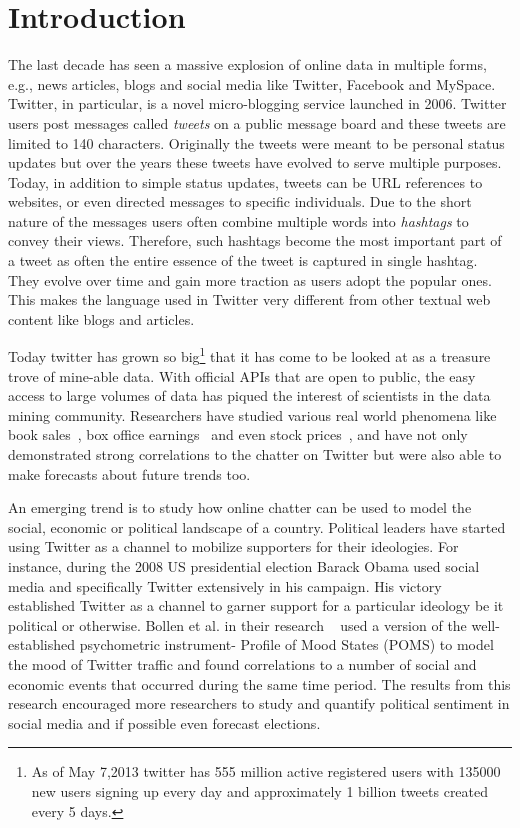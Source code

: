 \chapter{Introduction}
The last decade has seen a massive explosion of online data in multiple forms,
e.g.,  news articles, blogs and social media like Twitter, Facebook and MySpace.
Twitter, in particular, is a novel micro-blogging service launched in 2006.
Twitter users post messages called {\it tweets} on a public message board and these tweets are limited to 140 characters.
Originally the tweets were meant to be personal status updates but over the years these tweets have evolved to serve
multiple purposes.
Today, in addition to simple status updates, tweets can be URL references to websites, or even 
directed messages to specific individuals.
Due to the short nature of the messages users often combine multiple words into \emph{hashtags} to convey their views.
Therefore, such hashtags become the most important part of a tweet as often the entire essence of the tweet is captured in single hashtag.
They evolve over time and gain more traction as users adopt the popular ones.
This makes the language used in Twitter very different from other textual web content like blogs and articles.

Today twitter has grown so big\footnote{As of May 7,2013 twitter has 555 million active registered users with 135000 new users signing up every day and approximately 1 billion tweets created every 5 days.}
that it has come to be looked at as a treasure trove of mine-able data.
With official APIs that are open to public, the easy access to large volumes of data has piqued the interest 
of scientists in the data mining community.
Researchers have studied various real world phenomena like book sales~\cite{gruhl2005predictive}, box office earnings~\cite{asur2010predicting} and even stock prices~\cite{bollen2011twitter}, and have not only demonstrated strong 
correlations to the chatter on Twitter but were also able to make forecasts about future trends too.

An emerging trend is to study how online chatter can be used 
to model the social, economic or political landscape of a country.
Political leaders have started using Twitter as a channel to mobilize supporters for their ideologies.
For instance, during the 2008 US presidential election Barack Obama used social media and specifically 
Twitter extensively in his campaign. 
His victory established Twitter as a channel to garner support for a particular ideology be it political or otherwise.
Bollen et al. in their research ~\cite{bollen2011modeling} used a version of the well-established 
psychometric instrument- Profile of Mood States (POMS) to model the mood of Twitter traffic and found correlations to a number of social and economic events that occurred during the same time period. 
The results from this research encouraged more researchers to study and quantify political sentiment in 
social media and if possible even forecast elections.

